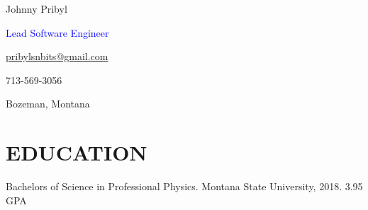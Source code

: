 \documentclass[11pt]{resume}
\begin{document}
    \noindent\begin{minipage}[t]{0.73\textwidth}
        \vspace{-5mm}
        {\par \Huge Johnny Pribyl}
        {\par \Large \textcolor{blue}{Lead Software Engineer}}
    \end{minipage}
    \begin{minipage}[t]{0.25\textwidth}
        \vspace{-5mm}
        \begin{flushright}
            {\par \textcolor{black}{\href{mailto:pribylsnbits@gmail.com}{pribylsnbits@gmail.com}}}
            {\par 713-569-3056}
            {\par Bozeman, Montana}
        \end{flushright}
    \end{minipage}
    \begin{minipage}[t]{0.03\textwidth}
        \vspace{-5mm}
        \begin{center}
            {\par \faEnvelope[regular]} 
            {\par \faMobile*} 
            {\par \faMapMarker*} 
        \end{center}
        \vspace{.01mm}
    \end{minipage}

    \noindent\begin{minipage}[t]{1\textwidth}
      \makebox[\linewidth]{\rule{\paperwidth}{0.2pt}}
    \end{minipage}

    \noindent\begin{minipage}[t]{1\textwidth}
      {\section* {\large{EDUCATION}}}
      \large{Bachelors of Science in Professional Physics. Montana State University,
      2018.
      3.95 GPA}
    \end{minipage}
\end{document}

